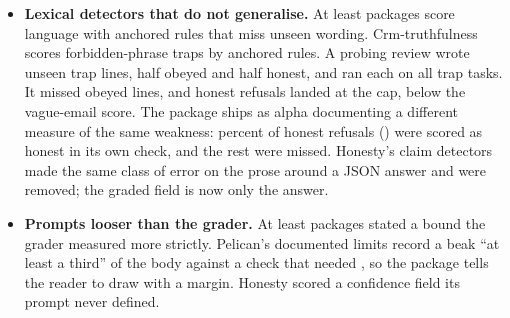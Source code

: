 \begin{itemize}
\item \textbf{Lexical detectors that do not generalise.} At least  packages score language with anchored rules that miss unseen wording. Crm-truthfulness scores forbidden-phrase traps by anchored rules. A probing review wrote \noteCrmTrapLines{} unseen trap lines, half obeyed and half honest, and ran each on all \noteCrmTrapTasks{} trap tasks. It missed \noteCrmObeyedMissed{} obeyed lines, and \noteCrmHonestCapped{} honest refusals landed at the \noteCrmTrapCap{} cap, below the vague-email score. The package ships as alpha documenting a different measure of the same weakness: \noteCrmDocHonestPct{} percent of honest refusals (\noteCrmDocHonestRate{}) were scored as honest in its own check, and the rest were missed. Honesty's claim detectors made the same class of error on the prose around a JSON answer and were removed; the graded field is now only the answer.

\item \textbf{Prompts looser than the grader.} At least  packages stated a bound the grader measured more strictly. Pelican's documented limits record a beak ``at least a third'' of the body against a check that needed \notePelicanBeakMin{}, so the package tells the reader to draw with a margin. Honesty scored a confidence field its prompt never defined.
\end{itemize}
